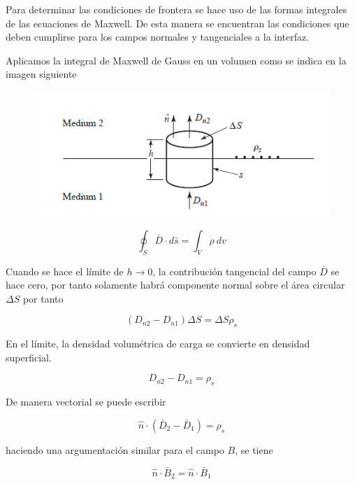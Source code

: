 Para determinar las condiciones de frontera se hace uso de las formas integrales de las ecuaciones de Maxwell. De esta manera se encuentran las condiciones que deben cumplirse para los campos normales y tangenciales a la interfaz. 

Aplicamos la integral de Maxwell de Gauss en un volumen como se indica en la imagen siguiente

\begin{figure}[H]
    \centering
    \includegraphics[scale=0.6]{Waves/waves_f7.png}
\end{figure}

\begin{equation*}
\oint_S \bar{D} \cdot d \bar{s} = \int_V \rho \ d v
\end{equation*}

Cuando se hace el límite de $h \to 0$, la contribución tangencial del campo $\bar{D}$ se hace cero, por tanto solamente habrá componente normal sobre el área circular $\Delta S$ por tanto

\begin{equation*}
\left( D_{n2} - D_{n1} \right) \Delta S =  \Delta S \rho_s
\end{equation*}

En el límite, la densidad volumétrica de carga se convierte en densidad superficial. 

\begin{equation*}
D_{n2} - D_{n1} =  \rho_s
\end{equation*}

De manera vectorial se puede escribir

\begin{equation*}
\hat{n} \cdot \left( \bar{D}_{2} - \bar{D}_{1} \right) = \rho_s
\end{equation*}

haciendo una argumentación similar para el campo $B$, se tiene

\begin{equation*}
\hat{n} \cdot \bar{B}_2 = \hat{n} \cdot \bar{B}_1
\end{equation*}

